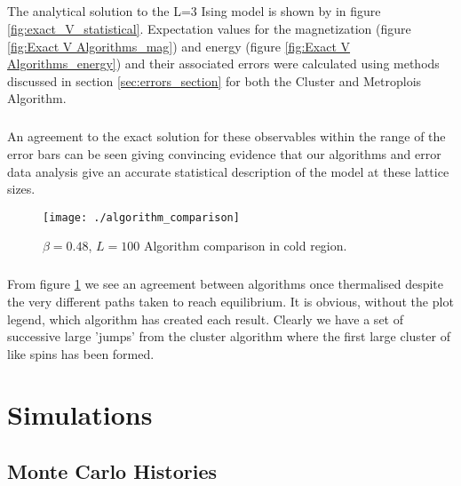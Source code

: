 \documentclass[12pt] {report} %
\begin{document}
			\paragraph{}
				The analytical solution to the L=3 Ising model is shown by in figure \ref{fig:exact_V_statistical}. Expectation values for the magnetization (figure \ref{fig:Exact V Algorithms_mag}) and energy (figure \ref{fig:Exact V Algorithms_energy}) and their associated errors were calculated using methods discussed in section \ref{sec:errors_section} for both the Cluster and Metroplois Algorithm.
			
			\paragraph{}
				An agreement to the exact solution for these observables within the range of the error bars can be seen giving convincing evidence that our algorithms and error data analysis give an accurate statistical description of the model at these lattice sizes.

			\begin{figure}[H]
				\centering
				\texttt{[image: ./algorithm\_comparison]}
				\caption{$\beta=0.48$, $L = 100$ Algorithm comparison in cold region.}
				\label{fig:algorithm_comparison}
			\end{figure}
				
			\paragraph{}
				From figure \ref{fig:algorithm_comparison} we see an agreement between algorithms once thermalised despite the very different paths taken to reach equilibrium. It is obvious, without the plot legend, which algorithm has created each result. Clearly we have a set of successive large 'jumps' from the cluster algorithm where the first large cluster of like spins has been formed.
			

				

		
		
	\chapter{Simulations}	\label{chapter:simulations}
		
		\section{Monte Carlo Histories}
			
\end{document}
